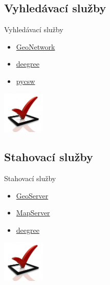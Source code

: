 \documentclass{beamer}
\begin{document}
\subsection{Vyhledávací služby}
\begin{frame}{Vyhledávací služby}
    \begin{itemize}
        \item \href{http://geonetwork-opensource.org}{GeoNetwork}
        \item \href{http://deegree.org}{deegree}
        \item \href{http://pycsw.org}{pycsw}
    \end{itemize}
    \begin{flushright} \includegraphics[width=2cm]{imgs/ils/done.jpg} \end{flushright}
\end{frame}

\subsection{Stahovací služby}
\begin{frame}{Stahovací služby}
    \begin{itemize}
        \item \href{http://geoserver.org}{GeoServer}
        \item \href{http://mapserver.org}{MapServer}
        \item \href{http://deegree.org}{deegree}
    \end{itemize}
    \begin{flushright}\includegraphics[width=2cm]{imgs/ils/done.jpg}\end{flushright}
\end{frame}
\end{document}
